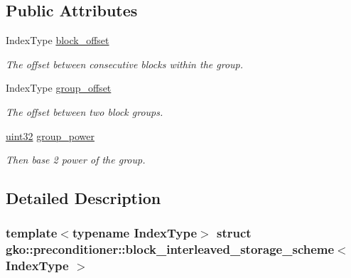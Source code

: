 \subsection*{Public Attributes}
\begin{DoxyCompactItemize}
\item 
\mbox{\label{structgko_1_1preconditioner_1_1block__interleaved__storage__scheme_ada09b37f171d433cc74818961fc6eccc}} 
Index\+Type \hyperlink{structgko_1_1preconditioner_1_1block__interleaved__storage__scheme_ada09b37f171d433cc74818961fc6eccc}{block\+\_\+offset}
\begin{DoxyCompactList}\small\item\em The offset between consecutive blocks within the group. \end{DoxyCompactList}\item 
\mbox{\label{structgko_1_1preconditioner_1_1block__interleaved__storage__scheme_aa8a6723ef709e69bda55eaabaeee582e}} 
Index\+Type \hyperlink{structgko_1_1preconditioner_1_1block__interleaved__storage__scheme_aa8a6723ef709e69bda55eaabaeee582e}{group\+\_\+offset}
\begin{DoxyCompactList}\small\item\em The offset between two block groups. \end{DoxyCompactList}\item 
\hyperlink{namespacegko_a318c831e3fe269ba04c6ed8bf5a71073}{uint32} \hyperlink{structgko_1_1preconditioner_1_1block__interleaved__storage__scheme_a8fa279f4178c767bdbf52ef4d7e23ad1}{group\+\_\+power}
\begin{DoxyCompactList}\small\item\em Then base 2 power of the group. \end{DoxyCompactList}\end{DoxyCompactItemize}


\subsection{Detailed Description}
\subsubsection*{template$<$typename Index\+Type$>$\newline
struct gko\+::preconditioner\+::block\+\_\+interleaved\+\_\+storage\+\_\+scheme$<$ Index\+Type $>$}

